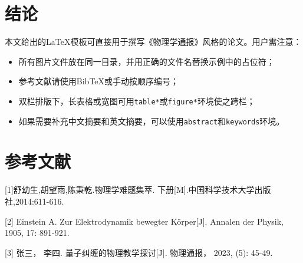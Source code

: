 \documentclass[twocolumn]{article} %
\begin{document}
\section{结论}

本文给出的LaTeX模板可直接用于撰写《物理学通报》风格的论文。用户需注意：

\begin{itemize}
  \item 所有图片文件放在同一目录，并用正确的文件名替换示例中的占位符；
  \item 参考文献请使用BibTeX或手动按顺序编号；
  \item 双栏排版下，长表格或宽图可用\texttt{table*}或\texttt{figure*}环境使之跨栏；
  \item 如果需要补充中文摘要和英文摘要，可以使用\texttt{abstract}和\texttt{keywords}环境。
\end{itemize}

\section*{参考文献}

[1]舒幼生,胡望雨,陈秉乾.物理学难题集萃. 下册[M].中国科学技术大学出版社,2014:611-616.

[2] Einstein A. Zur Elektrodynamik bewegter Körper[J]. Annalen der Physik, 1905, 17: 891-921.

[3] 张三， 李四. 量子纠缠的物理教学探讨[J]. 物理通报， 2023, (5): 45-49.
\end{document}
